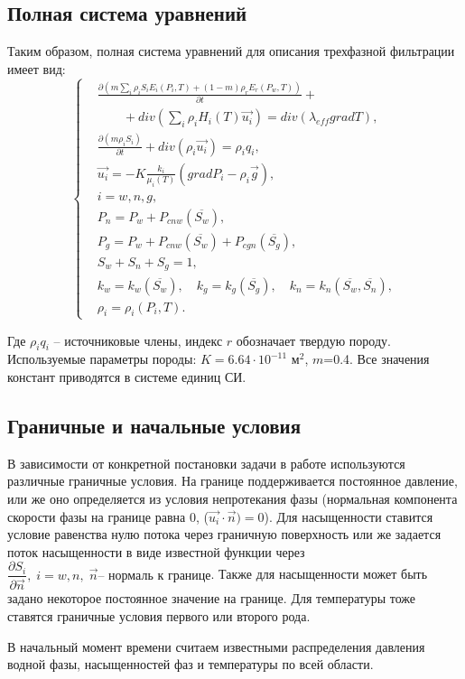 \subsection{Полная система уравнений}
Таким образом, полная система уравнений для описания трехфазной фильтрации
имеет вид:
\begin{equation}
\left\{
  \begin{aligned}
    &\frac{\partial \left(m {\sum\limits_{i}{\rho_i S_i E_i(P_i, T)}} + (1-m){\rho_r E_r(P_w, T)}\right)}{\partial t} + \\
    & \qquad + div(\sum_{i}{\rho_i H_i(T) \overrightarrow{u_i}}) = div(\lambda_{eff} grad T), \\
    &\frac{\partial (m \rho_i S_i)}{\partial t}+ div(\rho_i \overrightarrow{u_i}) = \rho_i q_i, \\
    &\overrightarrow{u_i}=-K \frac{k_i}{{\mu_i(T)}}(grad P_i - {\rho}_i\overrightarrow{g}), \\
    &i=w,n,g, \\
    &P_n=P_w+P_{cnw}(\overline{S_w}), \\
    &P_g=P_w+P_{cnw}(\overline{S_w})+P_{cgn}(\overline{S_g}), \\
    &S_w + S_n + S_g=1, \\
    &k_w=k_w(\overline{S_w}),\quad k_g=k_g(\overline{S_g}),\quad k_n=k_n(\overline{S_w},\overline{S_n}), \\
    &\rho_i=\rho_i(P_i,T).
  \end{aligned}
\right.
\end{equation}

Где $\rho_i q_i$ -- источниковые члены, индекс $r$ обозначает твердую породу.
Используемые параметры породы: $K=6.64\cdot 10^{-11}$ м$^2$, $m$=0.4.
Все значения констант приводятся в системе единиц СИ.

\subsection{Граничные и начальные условия}
В зависимости от конкретной постановки задачи в работе используются различные
граничные условия. На границе поддерживается постоянное давление, или же оно
определяется из условия непротекания фазы (нормальная компонента скорости
фазы на границе равна 0, ($\overrightarrow{u_i} \cdot \overrightarrow{n}) = 0$).
Для насыщенности ставится условие равенства нулю потока через граничную 
поверхность или же задается поток насыщенности в виде известной функции через 
$ \dfrac{\partial S_i}{\partial \overrightarrow{n}}, \; i=w,n, \; \overrightarrow{n} \text{-- нормаль к границе} $.
Также для насыщенности может быть задано некоторое постоянное значение на границе.
Для температуры тоже ставятся граничные условия первого или второго рода. 

В начальный момент времени считаем известными распределения давления водной 
фазы, насыщенностей фаз и температуры по всей области.
